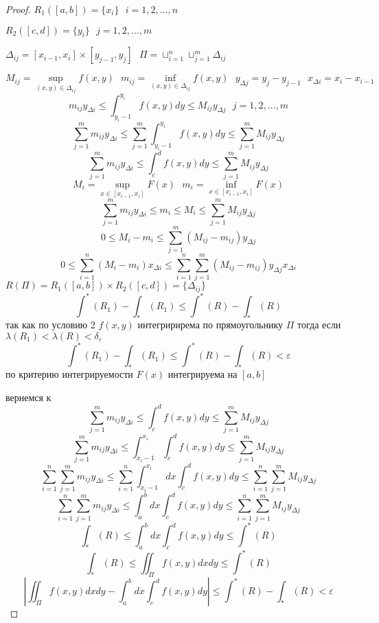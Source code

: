 \begin{proof}
  $R_1([a,b]) = \{x_i\} ~~~ i = 1,2, \ldots, n$

  $R_2([c,d]) = \{y_i\} ~~~ j = 1,2, \ldots, m$

  $\Delta_{ij} = [x_{i-1}, x_i] \times [y_{j-1}, y_j] ~~~ \Pi =
  \sqcup_{i=1}^n \sqcup_{j=1}^m \Delta_{ij}$

  $$
  M_{ij} = \sup_{(x,y) \in \Delta_{ij}} f(x,y) ~~~
  m_{ij} = \inf_{(x,y) \in \Delta_{ij}} f(x,y) ~~~ y_{\Delta j} = y_j - y_{j-1}
  ~~~ x_{\Delta i} = x_i - x_{i-1}
  $$
  $$
  m_{ij} y_{\Delta i} \le \int_{y_i-1}^{y_i} f(x,y)dy \le M_{ij} y_{\Delta j}
  ~~~ j = 1, 2, \ldots, m
  $$
  $$
  \sum_{j=1}^m m_{ij} y_{\Delta i} \le \sum_{j=1}^m \int_{y_i-1}^{y_i} f(x,y)dy
  \le \sum_{j=1}^m M_{ij} y_{\Delta j}
  $$
  $$
  \sum_{j=1}^m m_{ij} y_{\Delta i} \le \int_c^d f(x,y)dy \le \sum_{j=1}^m
  M_{ij} y_{\Delta j}
  $$
  $$
  M_i = \sup_{x \in [x_{i-1}, x_i]} F(x) ~~~ m_i =
  \inf_{x \in [x_{i-1}, x_i]} F(x)
  $$
  $$
  \sum_{j=1}^m m_{ij} y_{\Delta i} \le m_i \le M_i \le \sum_{j=1}^m
  M_{ij} y_{\Delta j}
  $$
  $$
  0 \le M_i - m_i \le \sum_{j=1}^m (M_{ij} - m_{ij}) y_{\Delta j}
  $$
  $$
  0 \le \sum_{i=1}^n (M_i - m_i)x_{\Delta i} \le \sum_{i=1}^n \sum_{j=1}^m
  (M_{ij} - m_{ij}) y_{\Delta j} x_{\Delta i}
  $$
  $R(\Pi) = R_1([a,b]) \times R_2([c,d]) = \{ \Delta_{ij} \}$
  $$
  \int^*(R_1) - \int_*(R_1) \le \int^*(R) - \int_*(R)
  $$
  так как по условию 2 $f(x,y)$ интегририрема по прямоугольнику $\Pi$ тогда
  если $\lambda(R_1) < \lambda(R) < \delta_{\varepsilon}$
  $$
  \int^*(R_1) - \int_*(R_1) \le \int^*(R) - \int_*(R) < \varepsilon
  $$
  по критерию интегрируемости $F(x)$ интегрируема на $[a,b]$

  вернемся к
  $$
  \sum_{j=1}^m m_{ij} y_{\Delta i} \le \int_c^d f(x,y)dy \le \sum_{j=1}^m
  M_{ij} y_{\Delta j}
  $$
  $$
  \sum_{j=1}^m m_{ij} y_{\Delta i} \le \int_{x_i-1}^{x_i} \int_c^d f(x,y)dy \le
  \sum_{j=1}^m M_{ij} y_{\Delta j}
  $$
  $$
  \sum_{i=1}^n \sum_{j=1}^m m_{ij} y_{\Delta i} \le \sum_{i=1}^n
  \int_{x_i-1}^{x_i} dx \int_c^d f(x,y)dy \le \sum_{i=1}^n \sum_{j=1}^m
  M_{ij} y_{\Delta j}
  $$
  $$
  \sum_{i=1}^n \sum_{j=1}^m m_{ij} y_{\Delta i} \le \int_a^b dx
  \int_c^d f(x,y)dy \le \sum_{i=1}^n \sum_{j=1}^m M_{ij} y_{\Delta j}
  $$
  $$
  \int_*(R) \le \int_a^b dx \int_c^d f(x,y)dy \le \int^*(R)
  $$
  $$
  \int_*(R) \le \iint_{\Pi} f(x,y)dx dy \le \int^*(R)
  $$
  $$
  \left| \iint_{\Pi} f(x,y)dx dy - \int_a^b dx \int_c^d f(x,y)dy \right| \le
  \int^*(R) - \int_*(R) < \varepsilon
  $$
\end{proof}


